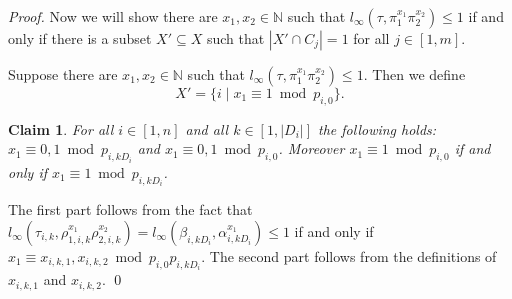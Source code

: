\documentclass{article}
\newtheorem{claim}{Claim}
\begin{document}
\begin{proof}
Now we will show there are $x_1,x_2 \in \mathbb{N}$ such that $l_\infty(\tau, \pi_1^{x_1}\pi_2^{x_2}) \leq 1$ if and only if there is a subset $X' \subseteq X$ such that $|X' \cap C_j| = 1$ for all $j \in [1,m]$.

Suppose there are $x_1,x_2 \in \mathbb{N}$ such that $l_\infty(\tau, \pi_1^{x_1}\pi_2^{x_2}) \leq 1$. Then we define
\begin{displaymath}
X' = \{i \mid x_1 \equiv 1 \bmod p_{i,0}\}.
\end{displaymath}
\begin{claim}\label{claimlinftyikDi}
For all $i \in [1,n]$ and all $k \in [1,|D_i|]$ the following holds: $x_1 \equiv 0,1 \bmod p_{i,kD_i}$ and $x_1 \equiv 0,1 \bmod p_{i,0}$. Moreover $x_1 \equiv 1 \bmod p_{i,0}$ if and only if $x_1 \equiv 1 \bmod p_{i,kD_i}$.
\end{claim}
The first part follows from the fact that $l_\infty(\tau_{i,k}, \rho_{1,i,k}^{x_1}\rho_{2,i,k}^{x_2}) = l_\infty(\beta_{i,kD_i}, \alpha_{i,kD_i}^{x_1}) \leq 1$ if and only if $x_1 \equiv x_{i,k,1},x_{i,k,2} \bmod p_{i,0}p_{i,kD_i}$. The second part follows from the definitions of $x_{i,k,1}$ and $x_{i,k,2}$.
\qed


\end{proof}
\end{document}
